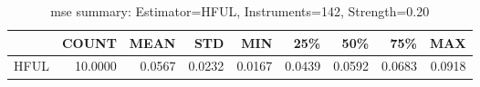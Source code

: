 \begin{table}[ht]
\centering
\caption{mse summary: Estimator=HFUL, Instruments=142, Strength=0.20}
\begin{tabular}{lrrrrrrrr}
\toprule
 & COUNT & MEAN & STD & MIN & 25\% & 50\% & 75\% & MAX \\
\midrule
HFUL & 10.0000 & 0.0567 & 0.0232 & 0.0167 & 0.0439 & 0.0592 & 0.0683 & 0.0918 \\
\bottomrule
\end{tabular}
\end{table}
